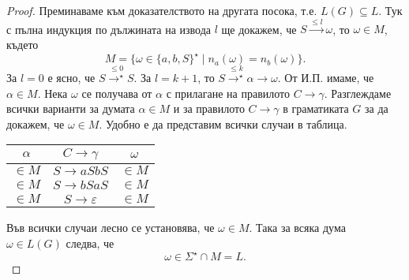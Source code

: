 \begin{proof}
  Преминаваме към доказателството на другата посока, т.е. $L(G) \subseteq L$.
  Тук с пълна индукция по дължината на извода $l$ ще докажем, че
  $S \stackrel{\leq l}{\rightarrow} \omega$, то $\omega \in M$,
  където
  \[M = \{\omega \in \{a,b,S\}^\star \mid n_a(\omega) = n_b(\omega)\}.\]
  За $l = 0$  е ясно, че $S \stackrel{\leq 0}{\rightarrow^\star} S$.
  За $l = k+1$, то $S \stackrel{\leq k}{\rightarrow^\star} \alpha \rightarrow \omega$.
  От И.П. имаме, че $\alpha \in M$.
  Нека $\omega$ се получава от $\alpha$ с прилагане на правилото $C \rightarrow \gamma$.
  Разглеждаме всички варианти за думата $\alpha \in M$ и за правилото $C\rightarrow \gamma$ в граматиката $G$
  за да докажем, че  $\omega \in M$.
  Удобно е да представим всички случаи в таблица.
  \begin{center}
    \begin{tabular}{| c | c | c |}
      \hline
      $\alpha$ & $C \rightarrow \gamma$ & $\omega$ \\ \hline
      $\in M$ & $S \rightarrow aSbS$ & $\in M$ \\ \hline
      $\in M$ & $S \rightarrow bSaS$ & $\in M$ \\ \hline
      $\in M$ & $S \rightarrow \varepsilon$ & $\in M$ \\ \hline
    \end{tabular}
  \end{center}
  Във всички случаи лесно се установява, че $\omega \in M$.
  Така за всяка дума $\omega \in L(G)$ следва, че
  \[\omega \in \Sigma^\star \cap M = L.\]
\end{proof}

